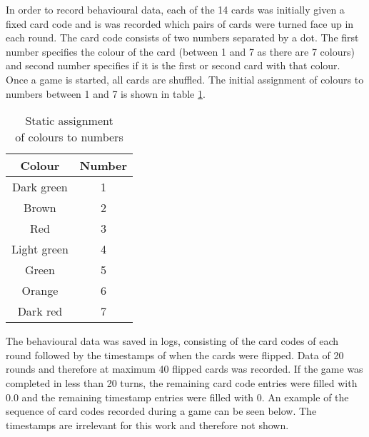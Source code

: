 \begin{minipage}[b]{0.6\textwidth}
	In order to record behavioural data, each of the 14 cards was initially given a fixed card code and is was recorded which pairs of cards were turned face up in each round. The card code consists of two numbers separated by a dot. The first number specifies the colour of the card (between 1 and 7 as there are 7 colours) and second number specifies if it is the first or second card with that colour. Once a game is started, all cards are shuffled. The initial assignment of colours to numbers between 1 and 7 is shown in table \ref{tab:colorAssign}.
\end{minipage}
\begin{minipage}[b]{0.4\textwidth}
	
	\begin{table}[H]
		\centering
		
		\begin{tabular}{|c|c|}
			\hline
			Colour & Number  \\
			\hline
			Dark green & 1 \\
			Brown & 2 \\
			Red & 3 \\
			Light green & 4 \\
			Green & 5 \\
			Orange & 6 \\
			Dark red & 7 \\
			\hline
		\end{tabular}
		\caption[Tabelle kurz]{Static assignment\\\hspace{0\textwidth}of colours to numbers}
		\label{tab:colorAssign}
	\end{table}
\end{minipage}




The behavioural data was saved in logs, consisting of the card codes of each round followed by the timestamps of when the cards were flipped. Data of 20 rounds and therefore at maximum 40 flipped cards was recorded. If the game was completed in less than 20 turns, the remaining card code entries were filled with 0.0 and the remaining timestamp entries were filled with 0. An example of the sequence of card codes recorded during a game can be seen below. The timestamps are irrelevant for this work and therefore not shown. 

